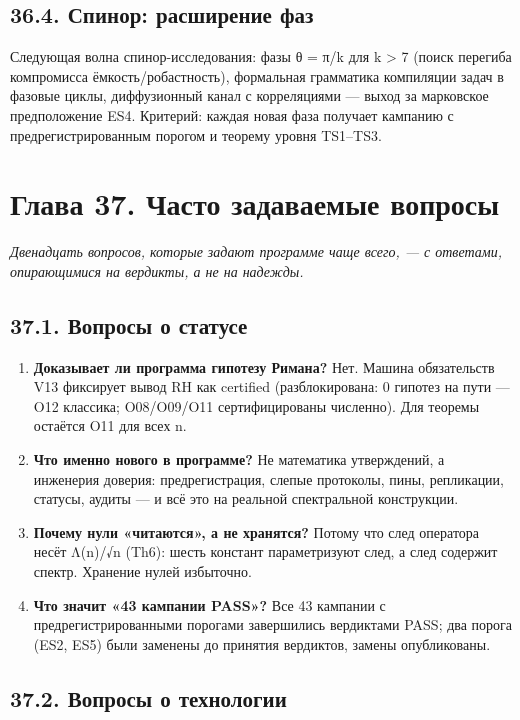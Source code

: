 \documentclass[11pt,a4paper]{article}
\begin{document}
\subsection{36.4. Спинор: расширение фаз}

Следующая волна спинор-исследования: фазы θ = π/k для k > 7 (поиск перегиба компромисса ёмкость/робастность), формальная грамматика компиляции задач в фазовые циклы, диффузионный канал с корреляциями — выход за марковское предположение ES4. Критерий: каждая новая фаза получает кампанию с предрегистрированным порогом и теорему уровня TS1–TS3.

\section{Глава 37. Часто задаваемые вопросы}

\noindent\textit{\color{copper}Двенадцать вопросов, которые задают программе чаще всего, — с ответами, опирающимися на вердикты, а не на надежды.}

\subsection{37.1. Вопросы о статусе}

\begin{enumerate}
  \item \textbf{Доказывает ли программа гипотезу Римана?} Нет. Машина обязательств V13 фиксирует вывод RH как certified (разблокирована: 0 гипотез на пути — O12 классика; O08/O09/O11 сертифицированы численно). Для теоремы остаётся O11 для всех n.
  \item \textbf{Что именно нового в программе?} Не математика утверждений, а инженерия доверия: предрегистрация, слепые протоколы, пины, репликации, статусы, аудиты — и всё это на реальной спектральной конструкции.
  \item \textbf{Почему нули «читаются», а не хранятся?} Потому что след оператора несёт Λ(n)/√n (Th6): шесть констант параметризуют след, а след содержит спектр. Хранение нулей избыточно.
  \item \textbf{Что значит «43 кампании PASS»?} Все 43 кампании с предрегистрированными порогами завершились вердиктами PASS; два порога (ES2, ES5) были заменены до принятия вердиктов, замены опубликованы.
\end{enumerate}

\subsection{37.2. Вопросы о технологии}
\end{document}
